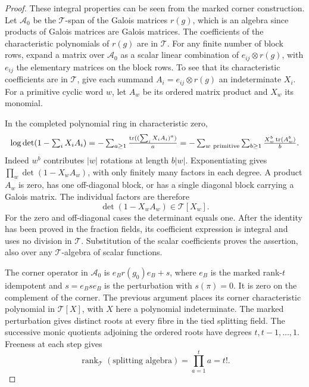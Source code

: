\begin{proof}
These integral properties can be seen from the marked
corner construction. Let \(\mathcal A_0\) be the
\(\mathcal T\)-span of the Galois matrices \(r(g)\),
which is an algebra since products of Galois matrices
are Galois matrices. The coefficients of the
characteristic polynomials of \(r(g)\) are in
\(\mathcal T\). For any finite number of block rows,
expand a matrix over \(\mathcal A_0\) as a scalar linear
combination of \(e_{ij}\otimes r(g)\), with \(e_{ij}\)
the elementary matrices on the block rows. To see that
its characteristic coefficients are in \(\mathcal T\),
give each summand \(A_i=e_{ij}\otimes r(g)\) an
indeterminate \(X_i\). For a primitive cyclic word \(w\), let
\(A_w\) be its ordered matrix product and \(X_w\) its monomial.

In the completed polynomial ring in characteristic zero,
\[
 \log\det(1-\textstyle\sum_iX_iA_i)
 =-\sum_{a\ge1}\frac{\operatorname{tr}((\sum_iX_iA_i)^a)}a
 =-\sum_{w\ {\rm primitive}}\sum_{b\ge1}
                    \frac{X_w^b\operatorname{tr}(A_w^b)}b .
\]
Indeed \(w^b\) contributes \(|w|\) rotations at length \(b|w|\).
Exponentiating gives \(\prod_w\det(1-X_w A_w)\), with only
finitely many factors in each degree.
A product \(A_w\) is zero, has one off-diagonal
block, or has a single diagonal block carrying a
Galois matrix. The individual factors are therefore
\[
 \det(1-X_w A_w)\in\mathcal T[X_w].
\]
For the zero and off-diagonal cases the determinant equals one. After the identity has been
proved in the fraction fields, its coefficient
expression is integral and uses no division in
\(\mathcal T\). Substitution of the scalar coefficients
proves the assertion, also over any \(\mathcal T\)-algebra
of scalar functions.

The corner operator in \(\mathcal A_0\) is
\(e_Br(g_0)e_B+s\), where \(e_B\) is the marked
rank-\(t\) idempotent and \(s=e_Bse_B\) is the
perturbation with \(s(\pi)=0\). It is zero on the
complement of the corner. The previous argument
places its corner characteristic polynomial in
\(\mathcal T[X]\), with \(X\) here a polynomial
indeterminate. The marked perturbation gives distinct
roots at every fibre in the tied splitting field.
The successive monic quotients adjoining the ordered roots have degrees \(t,t-1,\ldots,1\). Freeness at each step gives
\[
 \operatorname{rank}_{\mathcal T}(\text{splitting algebra})=\prod_{a=1}^{t}a=t!.
\]


\end{proof}
